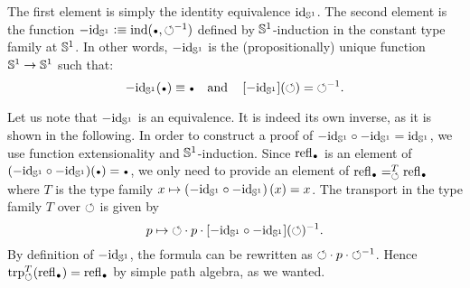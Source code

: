 \documentclass[english,a4paper]{lmcs}
\begin{document}
The first element is simply the identity equivalence $\mathord{\mathrm{id}}_{{\mathbb S^{1}}}$. The
second element is the function
$-\id_\Sc \defequi \ind(\base,\inv{\Sloop})$ defined by
${{\mathbb S^{1}}}$-induction in the constant type family at ${{\mathbb S^{1}}}$. In other words,
$-\mathord{\mathrm{id}}_{{\mathbb S^{1}}}$ is the (propositionally) unique function ${{\mathbb S^{1}}} \to {{\mathbb S^{1}}}$ such
that:
\begin{displaymath}
  -\id_\Sc(\base) \jdeq \base%
  \quad\text{and}\quad%
  \ap{-\id_\Sc}(\Sloop) = \inv{\Sloop}.
\end{displaymath}

Let us note that $-\mathord{\mathrm{id}}_{{\mathbb S^{1}}}$ is an equivalence. It is indeed its own inverse, as
it is shown in the following. In order to construct a proof of $-\mathord{\mathrm{id}}_{{\mathbb S^{1}}} \circ
-\mathord{\mathrm{id}}_{{\mathbb S^{1}}} = \mathord{\mathrm{id}}_{{\mathbb S^{1}}}$, we use function extensionality and ${{\mathbb S^{1}}}$-induction.
Since $\refl\base$ is an element of $(-\id_\Sc\circ -\id_\Sc)(\base) = \base$,
we only need to provide an element of $\pathover {\refl\base} T \Sloop
{\refl\base}$ where $T$ is the type family $x \mapsto \left(-\mathord{\mathrm{id}}_{{\mathbb S^{1}}} \circ -\mathord{\mathrm{id}}_{{\mathbb S^{1}}} \right)(x)
= x$. The transport in the type family $T$ over $\mathord{\circlearrowleft}$ is given by
\begin{displaymath}
  p \mapsto \mathord{\circlearrowleft} \cdot p \cdot [-\mathord{\mathrm{id}}_{{\mathbb S^{1}}} \circ -\mathord{\mathrm{id}}_{{\mathbb S^{1}}}](\mathord{\circlearrowleft})^{-1}.
\end{displaymath}
By definition of $-\mathord{\mathrm{id}}_{{\mathbb S^{1}}}$, the formula can be rewritten as $\mathord{\circlearrowleft} \cdot p
\cdot \mathord{\circlearrowleft}^{-1}$.  Hence $\trp[T] \Sloop (\refl\base) = \refl\base$ by simple
path algebra, as we wanted.
\end{document}
